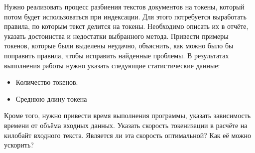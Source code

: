 
Нужно реализовать процесс разбиения текстов документов на токены, который потом будет использоваться при индексации. Для этого потребуется выработать правила, по которым текст делится на токены. Необходимо описать их в отчёте, указать достоинства и недостатки выбранного метода. Привести примеры токенов, которые были выделены неудачно, объяснить, как можно было бы поправить правила, чтобы исправить найденные проблемы.
В результатах выполнения работы нужно указать следующие статистические данные:

\begin{itemize}
    \item Количество токенов.
    \item Среднюю длину токена
\end{itemize}

Кроме того, нужно привести время выполнения программы, указать зависимость времени от
объёма входных данных. Указать скорость токенизации в расчёте на килобайт входного текста.
Является ли эта скорость оптимальной? Как её можно ускорить? 

\pagebreak
